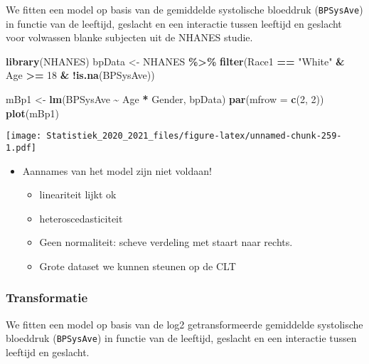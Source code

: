 \documentclass[
  12pt,dutch,coursenotes]{book}
\newenvironment{Shaded}{\begin{snugshade}}{\end{snugshade}}
\newcommand{\DataTypeTok}[1]{\textcolor[rgb]{0.13,0.29,0.53}{#1}}
\newcommand{\DecValTok}[1]{\textcolor[rgb]{0.00,0.00,0.81}{#1}}
\newcommand{\KeywordTok}[1]{\textcolor[rgb]{0.13,0.29,0.53}{\textbf{#1}}}
\newcommand{\NormalTok}[1]{#1}
\newcommand{\OperatorTok}[1]{\textcolor[rgb]{0.81,0.36,0.00}{\textbf{#1}}}
\newcommand{\StringTok}[1]{\textcolor[rgb]{0.31,0.60,0.02}{#1}}
\providecommand{\tightlist}{%
  \setlength{\itemsep}{0pt}\setlength{\parskip}{0pt}}
\theoremstyle{definition}
\theoremstyle{definition}
\theoremstyle{definition}
\theoremstyle{remark}
\begin{document}
We fitten een model op basis van de gemiddelde systolische bloeddruk (\texttt{BPSysAve}) in functie van de leeftijd, geslacht en een interactie tussen leeftijd en geslacht voor volwassen blanke subjecten uit de NHANES studie.

\begin{Shaded}
\begin{Highlighting}[]
\KeywordTok{library}\NormalTok{(NHANES)}
\NormalTok{bpData \textless{}{-}}\StringTok{ }\NormalTok{NHANES }\OperatorTok{\%\textgreater{}\%}\StringTok{ }\KeywordTok{filter}\NormalTok{(Race1 }\OperatorTok{==}\StringTok{ "White"} \OperatorTok{\&}\StringTok{ }\NormalTok{Age }\OperatorTok{\textgreater{}=}\StringTok{ }
\StringTok{    }\DecValTok{18} \OperatorTok{\&}\StringTok{ }\OperatorTok{!}\KeywordTok{is.na}\NormalTok{(BPSysAve))}

\NormalTok{mBp1 \textless{}{-}}\StringTok{ }\KeywordTok{lm}\NormalTok{(BPSysAve }\OperatorTok{\textasciitilde{}}\StringTok{ }\NormalTok{Age }\OperatorTok{*}\StringTok{ }\NormalTok{Gender, bpData)}
\KeywordTok{par}\NormalTok{(}\DataTypeTok{mfrow =} \KeywordTok{c}\NormalTok{(}\DecValTok{2}\NormalTok{, }\DecValTok{2}\NormalTok{))}
\KeywordTok{plot}\NormalTok{(mBp1)}
\end{Highlighting}
\end{Shaded}

\texttt{[image: Statistiek\_2020\_2021\_files/figure-latex/unnamed-chunk-259-1.pdf]}

\begin{itemize}
\item
  Aannames van het model zijn niet voldaan!

  \begin{itemize}
  \tightlist
  \item
    lineariteit lijkt ok
  \item
    heteroscedasticiteit
  \item
    Geen normaliteit: scheve verdeling met staart naar rechts.
  \item
    Grote dataset we kunnen steunen op de CLT
  \end{itemize}
\end{itemize}

\hypertarget{transformatie}{%
\subsubsection{Transformatie}\label{transformatie}}

We fitten een model op basis van de log2 getransformeerde gemiddelde systolische bloeddruk (\texttt{BPSysAve}) in functie van de leeftijd, geslacht en een interactie tussen leeftijd en geslacht.
\end{document}

